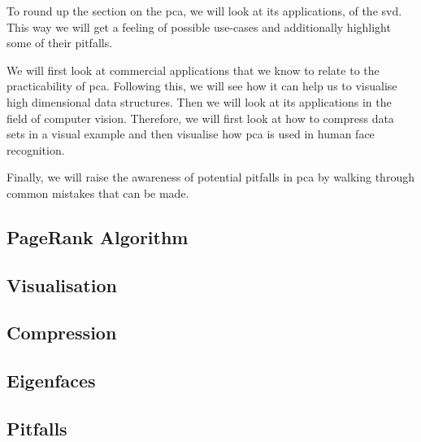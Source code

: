 To round up the section on the \acrlong{pca}, we will look at its applications, of the \acrlong{svd}.
This way we will get a feeling of possible use-cases and additionally highlight some of their pitfalls.

We will first look at commercial applications that we know to relate to the practicability of \gls{pca}.
Following this, we will see how it can help us to visualise high dimensional data structures.
Then we will look at its applications in the field of computer vision.
Therefore, we will first look at how to compress data sets in a visual example and then visualise how \gls{pca} is used in human face recognition.

Finally, we will raise the awareness of potential pitfalls in \gls{pca} by walking through common mistakes that can be made.


\subsection{PageRank Algorithm}

\clearpage

\subsection{Visualisation}

\clearpage

\subsection{Compression}

\clearpage

\subsection{Eigenfaces} \label{sec:eigenfaces}

\clearpage

\subsection{Pitfalls}

\clearpage
